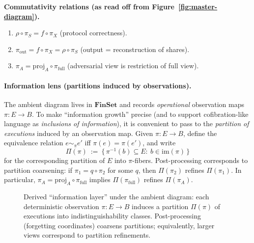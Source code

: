 \documentclass[11pt,a4paper]{article}
\theoremstyle{definition}
\theoremstyle{plain}
\begin{document}
\textbf{Commutativity relations (as read off from Figure~\ref{fig:master-diagram}).}
\begin{enumerate}
    \item $\rho \circ \pi_S = f \circ \pi_X$ (protocol correctness).
    \item $\pi_{\mathrm{out}} = f \circ \pi_X = \rho \circ \pi_S$ (output = reconstruction of shares).
    \item $\pi_A = \mathrm{proj}_A \circ \pi_{\mathrm{full}}$ (adversarial view is restriction of full view).
\end{enumerate}

\paragraph{Information lens (partitions induced by observations).}
The ambient diagram lives in $\mathbf{FinSet}$ and records \emph{operational} observation maps $\pi:E\to B$.
To make ``information growth'' precise (and to support cofibration-like language as \emph{inclusions of information}), it is convenient to pass to the \emph{partition of executions} induced by an observation map.
Given $\pi:E\to B$, define the equivalence relation $e\sim_\pi e'$ iff $\pi(e)=\pi(e')$, and write
\[
\Pi(\pi)\ :=\ \{\,\pi^{-1}(b)\subseteq E:\ b\in \mathrm{im}(\pi)\,\}
\]
for the corresponding partition of $E$ into $\pi$-fibers.
Post-processing corresponds to partition coarsening: if $\pi_1=q\circ \pi_2$ for some $q$, then $\Pi(\pi_2)$ refines $\Pi(\pi_1)$.
In particular, $\pi_A=\mathrm{proj}_A\circ \pi_{\mathrm{full}}$ implies $\Pi(\pi_{\mathrm{full}})$ refines $\Pi(\pi_A)$.

\begin{figure}[ht]
\centering
{}

\vspace{0.5em}

\caption{Derived ``information layer'' under the ambient diagram: each deterministic observation $\pi:E\to B$ induces a partition $\Pi(\pi)$ of executions into indistinguishability classes. Post-processing (forgetting coordinates) coarsens partitions; equivalently, larger views correspond to partition refinements.}
\label{fig:master-diagram-partition-lens}
\end{figure}
\end{document}
